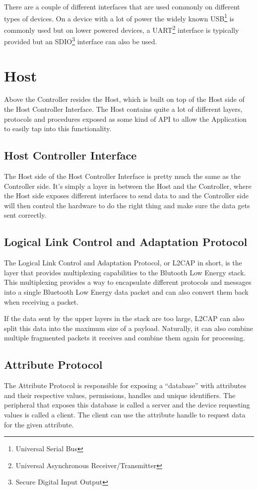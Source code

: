 \documentclass[pdftex,a4paper,12pt,twoside]{report}
\begin{document}
There are a couple of different interfaces that are used commonly on different types of devices. On a device with a lot of power the widely known USB\footnote{Universal Serial Bus} is commonly used but on lower powered devices, a UART\footnote{Universal Asynchronous Receiver/Transmitter} interface is typically provided but an SDIO\footnote{Secure Digital Input Output} interface can also be used.

\section{Host}
\label{sec:stackHost}
Above the Controller resides the Host, which is built on top of the Host side of the Host Controller Interface. The Host contains quite a lot of different layers, protocols and procedures exposed as some kind of API to allow the Application to easily tap into this functionality.

\subsection{Host Controller Interface}
\label{subsec:hostHCI}
The Host side of the Host Controller Interface is pretty much the same as the Controller side. It's simply a layer in between the Host and the Controller, where the Host side exposes different interfaces to send data to and the Controller side will then control the hardware to do the right thing and make sure the data gets sent correctly.

\subsection{Logical Link Control and Adaptation Protocol}
\label{subsec:hostL2CAP}
The Logical Link Control and Adaptation Protocol, or L2CAP in short, is the layer that provides multiplexing capabilities to the Blutooth Low Energy stack. This multiplexing provides a way to encapsulate different protocols and messages into a single Bluetooth Low Energy data packet and can also convert them back when receiving a packet.

If the data sent by the upper layers in the stack are too large, L2CAP can also split this data into the maximum size of a payload. Naturally, it can also combine multiple fragmented packets it receives and combine them again for processing.

\subsection{Attribute Protocol}
\label{subsec:hostATT}
The Attribute Protocol is responsible for exposing a ``database'' with attributes and their respective values, permissions, handles and unique identifiers. The peripheral that exposes this database is called a server and the device requesting values is called a client. The client can use the attribute handle to request data for the given attribute.
\end{document}
